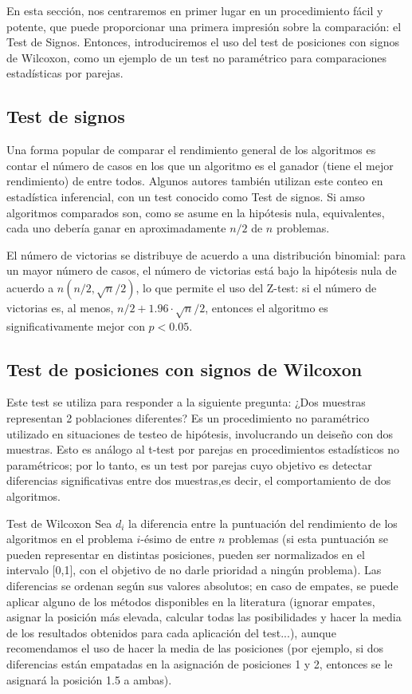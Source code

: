 En esta sección, nos centraremos en primer lugar en un procedimiento fácil y potente, que puede proporcionar una primera impresión sobre la comparación: el Test de Signos. 
Entonces, introduciremos el uso del test de posiciones con signos de Wilcoxon, como un ejemplo de un test no paramétrico para comparaciones estadísticas por parejas. 

\subsection{Test de signos}

Una forma popular de comparar el rendimiento general de los algoritmos es contar el número de casos en los que un algoritmo es el ganador (tiene el mejor rendimiento) de entre todos. 
Algunos autores también utilizan este conteo en estadística inferencial, con un test conocido como Test de signos. 
Si amso algoritmos comparados son, como se asume en la hipótesis nula, equivalentes, cada uno debería ganar en aproximadamente $n/2$ de $n$ problemas. 

El número de victorias se distribuye de acuerdo a una distribución binomial: para un mayor número de casos, el número de victorias está bajo la hipótesis nula de acuerdo a $n(n/2, \sqrt{n}/2)$, lo que permite el uso del Z-test: si el número de victorias es, al menos, $n/2 + 1.96\cdot \sqrt{n}/2$, entonces el algoritmo es significativamente mejor con $p < 0.05$. 

\subsection{Test de posiciones con signos de Wilcoxon}

Este test se utiliza para responder a la siguiente pregunta: ¿Dos muestras representan 2 poblaciones diferentes? 
Es un procedimiento no paramétrico utilizado en situaciones de testeo de hipótesis, involucrando un deiseño con dos muestras. 
Esto es análogo al t-test por parejas en procedimientos estadísticos no paramétricos; por lo tanto, es un test por parejas cuyo objetivo es detectar diferencias significativas entre dos  muestras,es decir, el comportamiento de dos algoritmos. 

\begin{definicion}{Test de Wilcoxon}
Sea $d_i$ la diferencia entre la puntuación del rendimiento de los algoritmos en el problema $i$-ésimo de entre $n$ problemas (si esta puntuación se pueden representar en distintas posiciones, pueden ser normalizados en el intervalo [0,1], con el objetivo de no darle prioridad a ningún problema). 
Las diferencias se ordenan según sus valores absolutos; en caso de empates, se puede aplicar alguno de los métodos disponibles en la literatura (ignorar empates, asignar la posición más elevada, calcular todas las posibilidades y hacer la media de los resultados obtenidos para cada aplicación del test...), aunque recomendamos el uso de hacer la media de las posiciones (por ejemplo, si dos diferencias están empatadas en la asignación de posiciones 1 y 2, entonces se le asignará la posición 1.5 a ambas).
\end{definicion} 

